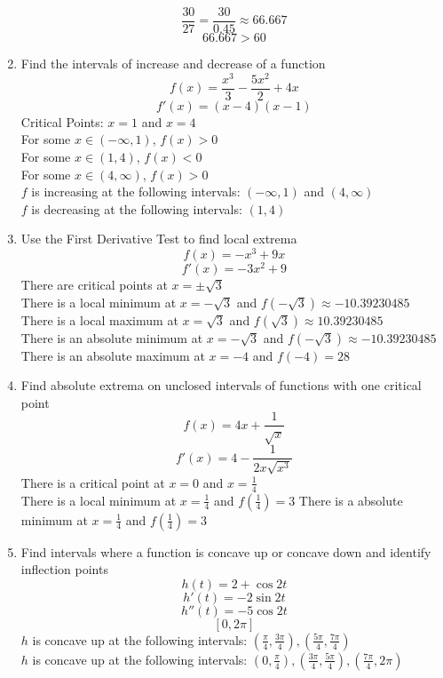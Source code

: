 \documentclass{article}
\begin{document}
\begin{enumerate}
    $$\frac{30}{27} = \frac{30}{0.45} \approx 66.667$$
    $$66.667 > 60$$
    \item Find the intervals of increase and decrease of a function
    $$f(x) = \frac{x^3}{3} - \frac{5x^2}{2} + 4x$$
    $$f'(x) = \left(x - 4\right)\left(x - 1\right)$$
    Critical Points: $x = 1$ and $x = 4$ \\
    For some $x \in (-\infty, 1)$, $f(x) > 0$ \\
    For some $x \in (1, 4)$, $f(x) < 0$ \\
    For some $x \in (4, \infty)$, $f(x) > 0$ \\
    $f$ is increasing at the following intervals: $(-\infty, 1)$ and $(4, \infty)$ \\
    $f$ is decreasing at the following intervals: $(1, 4)$
    \item Use the First Derivative Test to find local extrema
    $$f(x) = -x^3 + 9x$$
    $$f'(x) = -3x^2 + 9$$
    There are critical points at $x = \pm \sqrt{3}$ \\
    There is a local minimum at $x = -\sqrt{3}$ and $f(-\sqrt{3}) \approx -10.39230485$ \\
    There is a local maximum at $x = \sqrt{3}$ and $f(\sqrt{3}) \approx 10.39230485$ \\
    There is an absolute minimum at $x = -\sqrt{3}$ and $f(-\sqrt{3}) \approx -10.39230485$ \\
    There is an absolute maximum at $x = -4$ and $f(-4) = 28$
    \item Find absolute extrema on unclosed intervals of functions with one critical point
    $$f(x) = 4x + \frac{1}{\sqrt{x}}$$
    $$f'(x) = 4 - \frac{1}{2x\sqrt{x^3}}$$
    There is a critical point at $x = 0$ and $x = \frac{1}{4}$ \\
    There is a local minimum at $x = \frac{1}{4}$ and $f\left(\frac{1}{4}\right) = 3$
    There is a absolute minimum at $x = \frac{1}{4}$ and $f\left(\frac{1}{4}\right) = 3$
    \item Find intervals where a function is concave up or concave down and identify inflection points
    $$h(t) = 2 + \cos{2t}$$
    $$h'(t) = -2\sin{2t}$$
    $$h''(t) = -5\cos{2t}$$
    $$[0, 2\pi]$$
    $h$ is concave up at the following intervals: $\left(\frac{\pi}{4}, \frac{3\pi}{4}\right), \left(\frac{5\pi}{4}, \frac{7\pi}{4}\right)$ \\
    $h$ is concave up at the following intervals: $\left(0, \frac{\pi}{4}\right), \left(\frac{3\pi}{4}, \frac{5\pi}{4}\right), \left(\frac{7\pi}{4}, 2\pi\right)$ \\

\end{enumerate}
\end{document}
